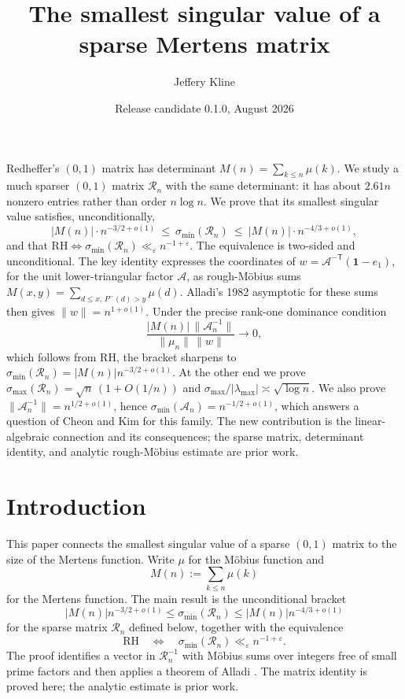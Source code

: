 \documentclass[11pt]{article}
\title{The smallest singular value of a sparse Mertens matrix}
\author{Jeffery Kline}
\date{Release candidate 0.1.0, August 2026}
\renewenvironment{abstract}{%
  \small
  \begin{center}\bfseries\abstractname\end{center}
  \list{}{\leftmargin=3em \rightmargin=\leftmargin
          \listparindent=1.5em \itemindent=0pt
          \parsep=0pt \topsep=0pt}%
  \item\relax\ignorespaces
}{\endlist\medskip}
\theoremstyle{definition}
\theoremstyle{remark}
\newcommand{\Rc}{\mathcal{R}}
\newcommand{\Ac}{\mathcal{A}}
\newcommand{\Pm}{P^{-}}
\begin{document}
\maketitle

\begin{abstract}
Redheffer's $(0,1)$ matrix has determinant $M(n)=\sum_{k\le n}\mu(k)$. We study a
much sparser $(0,1)$ matrix $\Rc_n$ with the same determinant: it has about
$2.61n$ nonzero entries rather than order $n\log n$. We prove that its smallest
singular value satisfies, unconditionally,
\[
  |M(n)|\cdot n^{-3/2+o(1)}\ \le\ \sigma_{\min}(\Rc_n)\ \le\
  |M(n)|\cdot n^{-4/3+o(1)},
\]
and that
$\mathrm{RH}\iff\sigma_{\min}(\Rc_n)\ll_\varepsilon n^{-1+\varepsilon}$.
The equivalence is two-sided and unconditional. The key identity expresses the
coordinates of $w=\Ac^{-\mathsf T}(\mathbf 1-e_1)$, for the unit
lower-triangular factor $\Ac$, as rough-M\"obius sums
$M(x,y)=\sum_{d\le x,\,\Pm(d)>y}\mu(d)$. Alladi's 1982 asymptotic for these sums
\cite{alladiJNT} then gives $\|w\|=n^{1+o(1)}$. Under the precise rank-one
dominance condition
\[
 \frac{|M(n)|\,\|\Ac_n^{-1}\|}{\|\mu_n\|\,\|w\|}\longrightarrow0,
\]
which follows from RH, the bracket sharpens to
$\sigma_{\min}(\Rc_n)=|M(n)|n^{-3/2+o(1)}$. At the other end we prove
$\sigma_{\max}(\Rc_n)=\sqrt n\,(1+O(1/n))$ and
$\sigma_{\max}/|\lambda_{\max}|\asymp\sqrt{\log n}$. We also prove
$\|\Ac_n^{-1}\|=n^{1/2+o(1)}$, hence
$\sigma_{\min}(\Ac_n)=n^{-1/2+o(1)}$, which answers a question of Cheon and Kim
for this family. The new contribution is the linear-algebraic connection and
its consequences; the sparse matrix, determinant identity, and analytic
rough-M\"obius estimate are prior work.
\end{abstract}

\section{Introduction}\label{sec:intro}

This paper connects the smallest singular value of a sparse $(0,1)$ matrix to
the size of the Mertens function. Write $\mu$ for the M\"obius function and
\[
  M(n) := \sum_{k\le n}\mu(k)
\]
for the Mertens function. The main result is the unconditional bracket
\[
 |M(n)|n^{-3/2+o(1)}\le \sigma_{\min}(\Rc_n)
 \le |M(n)|n^{-4/3+o(1)}
\]
for the sparse matrix $\Rc_n$ defined below, together with the equivalence
\[
 \mathrm{RH}\quad\Longleftrightarrow\quad
 \sigma_{\min}(\Rc_n)\ll_\varepsilon n^{-1+\varepsilon}.
\]
The proof identifies a vector in $\Rc_n^{-1}$ with M\"obius sums over integers
free of small prime factors and then applies a theorem of Alladi
\cite{alladiJNT}. The matrix identity is proved here; the analytic estimate is
prior work.
\end{document}
